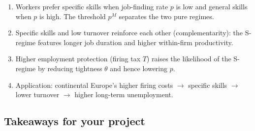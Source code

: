 \documentclass[12pt]{article}
\begin{document}
\begin{enumerate}
    \item Workers prefer specific skills when job-finding rate $p$ is low and general skills when $p$ is high. The threshold $p^M$ separates the two pure regimes.
    \item Specific skills and low turnover reinforce each other (complementarity): the S-regime features longer job duration and higher within-firm productivity.
    \item Higher employment protection (firing tax $T$) raises the likelihood of the S-regime by reducing tightness $\theta$ and hence lowering $p$.
    \item Application: continental Europe's higher firing costs $\to$ specific skills $\to$ lower turnover $\to$ higher long-term unemployment.
\end{enumerate}

\subsection*{Takeaways for your project}
\end{document}
